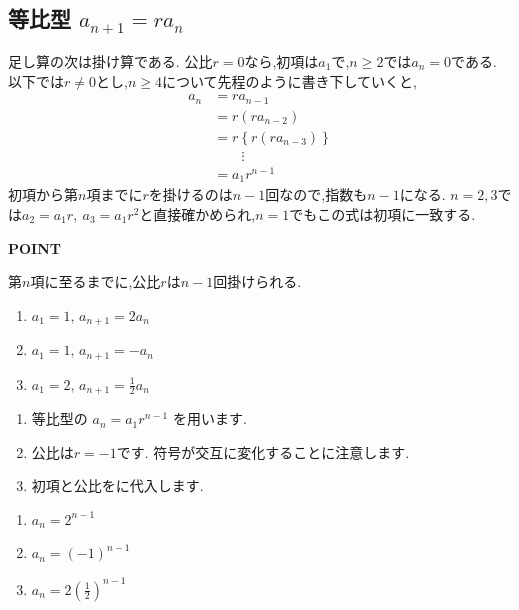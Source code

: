 
\subsection{\texorpdfstring{等比型  $a_{n+1}=ra_n$}{等比型}}\label{節：等比型}
足し算の次は掛け算である.
公比$r=0$なら,初項は$a_1$で,$n\ge2$では$a_n=0$である.
以下では$r\ne0$とし,$n\ge4$について先程のように書き下していくと,
\begin{align*}
  a_n&=ra_{n-1}\\
  &=r(ra_{n-2})\\
  &=r\left\{r(ra_{n-3})\right\}\\
  &\qquad \vdots\\
  &=a_1r^{n-1}
\end{align*}
初項から第$n$項までに$r$を掛けるのは$n-1$回なので,指数も$n-1$になる.
$n=2,3$では$a_2=a_1r,\ a_3=a_1r^2$と直接確かめられ,$n=1$でもこの式は初項に一致する.
\begin{bookpoint}
  \textbf{POINT}\par
  第$n$項に至るまでに,公比$r$は$n-1$回掛けられる.
\end{bookpoint}

\noindent {}\par\nobreak
\begin{enumerate}[label=(\arabic*),parsep=3pt,format=\bookitemlink{example-geometric-1}{problem}{hint}]
  \item $a_1=1,\, a_{n+1}=2a_n$
  \item $a_1=1,\, a_{n+1}=-a_n$
  \item $a_1=2,\, a_{n+1}=\frac{1}{2}a_n$
\end{enumerate}

\noindent{}\par\nobreak
\begin{enumerate}[label=(\arabic*),parsep=3pt,format=\bookitemlink{example-geometric-1}{hint}{answer}]
  \item 等比型の
    $a_n=a_1r^{n-1}$
    を用います.
  \item 公比は$r=-1$です.
    符号が交互に変化することに注意します.
  \item 初項と公比をに代入します.
\end{enumerate}

\noindent{}\par\nobreak
\begin{enumerate}[label=(\arabic*),parsep=3pt,format=\bookitemlink{example-geometric-1}{answer}{solution}]
  \item $a_n=2^{n-1}$
  \item $a_n=(-1)^{n-1}$
  \item $a_n=2\left(\frac12\right)^{n-1}$
\end{enumerate}

